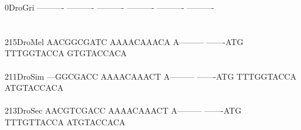 \documentclass[11pt,twoside,reqno,a4paper]{article}
\begin{document}
{0\hspace*{4\charwidth}DroGri	----------	----------	----------	----------	----------	----------	\\
\hspace*{5\charwidth}\hspace*{7\charwidth}\hspace*{1\charwidth}\hspace*{1\charwidth}\hspace*{1\charwidth}\hspace*{1\charwidth}\hspace*{1\charwidth}\hspace*{1\charwidth}\\
\\
215\hspace*{2\charwidth}DroMel	AACGGCGATC	AAAACAAACA	A---------	-------ATG	TTTGGTACCA	GTGTACCACA	\\
\hspace*{5\charwidth}\hspace*{7\charwidth}\hspace*{1\charwidth}\hspace*{1\charwidth}\hspace*{1\charwidth}\hspace*{1\charwidth}\hspace*{1\charwidth}\hspace*{1\charwidth}\\
211\hspace*{2\charwidth}DroSim	---GGCGACC	AAAACAAACT	A---------	-------ATG	TTTGGTACCA	ATGTACCACA	\\
\hspace*{5\charwidth}\hspace*{7\charwidth}\hspace*{1\charwidth}\hspace*{1\charwidth}\hspace*{1\charwidth}\hspace*{1\charwidth}\hspace*{1\charwidth}\hspace*{1\charwidth}\\
213\hspace*{2\charwidth}DroSec	AACGTCGACC	AAAACAAACT	A---------	-------ATG	TTTGTTACCA	ATGTACCACA	\\
\hspace*{5\charwidth}\hspace*{7\charwidth}\hspace*{1\charwidth}\hspace*{1\charwidth}\hspace*{1\charwidth}\hspace*{1\charwidth}\hspace*{1\charwidth}\hspace*{1\charwidth}\\
}
\end{document}
